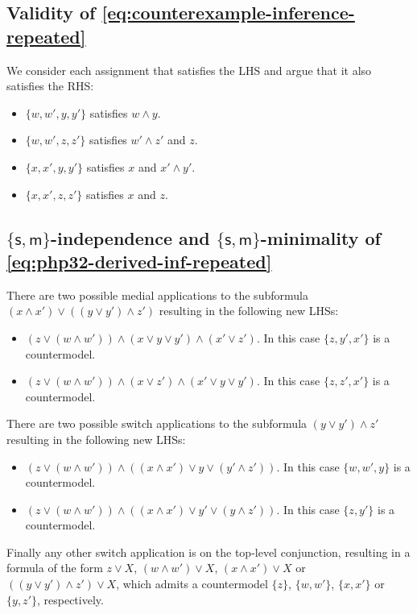 \documentclass[a4paper, UKenglish, cleveref]{lipics-v2021}
\newcommand{\m}{\ensuremath{\mathsf{m}}}
\newcommand{\s}{\ensuremath{\mathsf{s}}}
\begin{document}
\subsection{Validity of \cref{eq:counterexample-inference-repeated}}
\label{sec:app:validity-counterexample-inference}
We consider each assignment that satisfies the LHS and argue that it also satisfies the RHS:
\begin{itemize}
\item $\{w,w',y,y' \}$ satisfies $w\land y$.
\item $\{w,w',z,z' \}$ satisfies $w' \land z' $ and $z$.
\item $\{ x,x',y,y' \}$ satisfies $x$ and $x' \land y' $.
\item $\{x,x',z,z' \}$ satisfies $x$ and $z$.
\end{itemize}

\subsection{$\{\s,\m\}$-independence and $\{\s,\m\}$-minimality of \cref{eq:php32-derived-inf-repeated}}
\label{sec:ind-min-php32}

There are two possible medial applications to the subformula $(x \land x') \lor ((y \lor y') \land z')$ resulting in the following new LHSs:
\begin{itemize}
\item $(z \lor (w \land w')) \land (x \lor y \lor y') \land (x' \lor z')$. In this case $\{z, y', x'\}$ is a countermodel.
\item $(z \lor (w \land w')) \land (x \lor z') \land (x' \lor y \lor y')$. In this case $\{z, z', x'\}$ is a countermodel.
\end{itemize}

There are two possible switch applications to the subformula $(y \lor y') \land z'$ resulting in the following new LHSs:
\begin{itemize}
\item $(z \lor (w \land w')) \land ((x \land x') \lor y \lor (y' \land z'))$. In this case $\{w ,w',y\}$ is a countermodel.
\item $(z \lor (w \land w')) \land ((x \land x') \lor y' \lor (y \land z'))$. In this case $\{z, y'\}$ is a countermodel.
\end{itemize}

Finally any other switch application is on the top-level conjunction, resulting in a formula of the form $z \lor X$, $(w \land w') \lor X$, $(x \land x') \lor X$ or $((y \lor y') \land z') \lor X$, which admits a countermodel $\{z\}$, $\{w, w'\}$, $\{x, x'\}$ or $\{y ,z'\}$, respectively.
\end{document}
